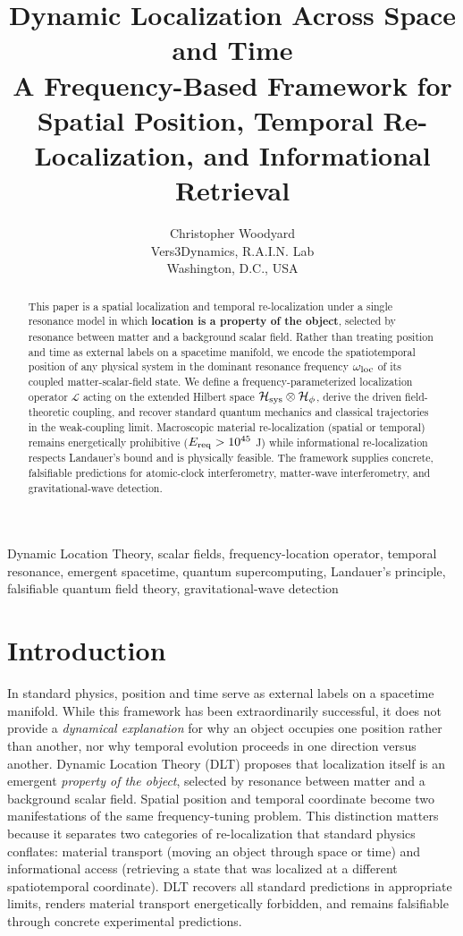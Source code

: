 \documentclass[conference,letterpaper,10pt]{IEEEtran}
\title{Dynamic Localization Across Space and Time\\
A Frequency-Based Framework for Spatial Position, Temporal Re-Localization, and Informational Retrieval}
\author{
  Christopher Woodyard\\
  Vers3Dynamics, R.A.I.N. Lab\\
  Washington, D.C., USA
}
\begin{document}
\maketitle

\begin{abstract}
This paper is a spatial localization and temporal re-localization under a single resonance model in which
\textbf{location is a property of the object}, selected by resonance between matter and a background scalar field.
Rather than treating position and time as external labels on a spacetime manifold, we encode the spatiotemporal
position of any physical system in the dominant resonance frequency \(\omega_{\rm loc}\) of its coupled
matter-scalar-field state. We define a frequency-parameterized localization operator \(\mathcal{L}\) acting on the
extended Hilbert space \(\mathcal{H}_{\rm sys} \otimes \mathcal{H}_\phi\), derive the driven field-theoretic coupling,
and recover standard quantum mechanics and classical trajectories in the weak-coupling limit. Macroscopic material
re-localization (spatial or temporal) remains energetically prohibitive (\(E_{\rm req} > 10^{45}\) J) while
informational re-localization respects Landauer's bound and is physically feasible. The framework supplies concrete,
falsifiable predictions for atomic-clock interferometry, matter-wave interferometry, and gravitational-wave detection.
\end{abstract}

\begin{IEEEkeywords}
Dynamic Location Theory, scalar fields, frequency-location operator, temporal resonance, emergent spacetime, quantum
supercomputing, Landauer's principle, falsifiable quantum field theory, gravitational-wave detection
\end{IEEEkeywords}

\section{Introduction}
In standard physics, position and time serve as external labels on a spacetime manifold. While this framework has been
 extraordinarily successful, it does not provide a \emph{dynamical explanation} for why an object occupies one
position rather than another, nor why temporal evolution proceeds in one direction versus another. Dynamic Location
Theory (DLT) proposes that localization itself is an emergent \emph{property of the object}, selected by resonance
between matter and a background scalar field. Spatial position and temporal coordinate become two manifestations of
the same frequency-tuning problem.
This distinction matters because it separates two categories of re-localization that standard physics conflates:
material transport (moving an object through space or time) and informational access (retrieving a state that was
localized at a different spatiotemporal coordinate). DLT recovers all standard predictions in appropriate limits,
renders material transport energetically forbidden, and remains falsifiable through concrete experimental predictions.
\end{document}
